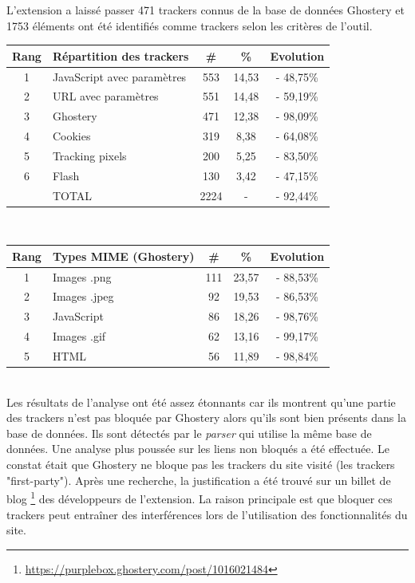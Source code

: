 L'extension a laissé passer 471 trackers connus de la base de données Ghostery et 1753 éléments ont été identifiés comme trackers selon les critères de l'outil.\\

\begin{tabular}{ c | p{5cm} | c | c || c | }
   Rang & Répartition des trackers & \# & \% & Evolution \\
   \hline
   \hline
   1 & JavaScript avec paramètres & 553 & 14,53 & - 48,75\% \\
   2 & URL avec paramètres & 551 & 14,48 & - 59,19\% \\
   3 & Ghostery & 471 & 12,38 & - 98,09\% \\
   4 & Cookies & 319 & 8,38 & - 64,08\% \\
   5 & Tracking pixels & 200 & 5,25 & - 83,50\% \\
   6 & Flash & 130 & 3,42 & - 47,15\% \\
   \hline
    & TOTAL & 2224 & - & - 92,44\%\\
   \hline
\end{tabular}
\\[1cm]

\begin{tabular}{ c | p{5cm} | c | c | c | }
   Rang & Types MIME (Ghostery) & \# & \% & Evolution\\
   \hline
   \hline
   1 & Images .png & 111 & 23,57 & - 88,53\% \\
   2 & Images .jpeg & 92 & 19,53 & - 86,53\% \\
   3 & JavaScript & 86 & 18,26 & - 98,76\% \\
   4 & Images .gif & 62 & 13,16 & - 99,17\% \\
   5 & HTML & 56 & 11,89 & - 98,84\% \\
   \hline
\end{tabular}
\\[.3cm]

Les résultats de l'analyse ont été assez étonnants car ils montrent qu'une partie des trackers n'est pas bloquée par Ghostery alors qu'ils sont bien présents dans la base de données. Ils sont détectés par le \textit{parser} qui utilise la même base de données. Une analyse plus poussée sur les liens non bloqués a été effectuée. Le constat était que Ghostery ne bloque pas les trackers du site visité (les trackers "first-party"). Après une recherche, la justification a été trouvé sur un billet de blog \footnote{\url{https://purplebox.ghostery.com/post/1016021484}} des développeurs de l'extension. La raison principale est que bloquer ces trackers peut entraîner des interférences lors de l'utilisation des fonctionnalités du site.


